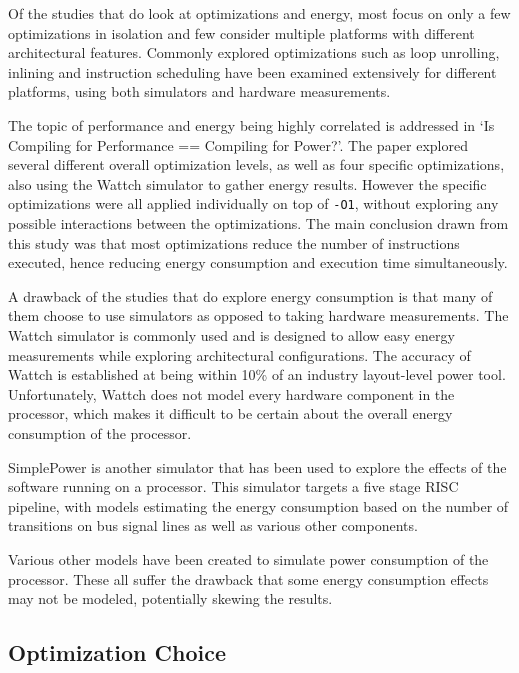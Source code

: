 \documentclass[twocolumn]{article}
\begin{document}
Of the studies that do look at optimizations and energy, most focus on only a few optimizations in isolation and few consider multiple platforms with different architectural features. Commonly explored optimizations such as loop unrolling, inlining and instruction scheduling have been examined extensively for different platforms, using both simulators and hardware measurements\cite{EffectOfCompilerOptimizationsOnPentium4}.

The topic of performance and energy being highly correlated is addressed in `Is Compiling for Performance == Compiling for Power?'\cite{CompilingForPerformancePower}. The paper explored several different overall optimization levels, as well as four specific optimizations, also using the Wattch simulator to gather energy results. However the specific optimizations were all applied individually on top of \texttt{-O1}, without exploring any possible interactions between the optimizations. The main conclusion drawn from this study was that most optimizations reduce the number of instructions executed, hence reducing energy consumption and execution time simultaneously.

A drawback of the studies that do explore energy consumption is that many of them choose to use simulators as opposed to taking hardware measurements. The Wattch simulator\cite{Wattch} is commonly used and is designed to allow easy energy measurements while exploring architectural configurations. The accuracy of Wattch is established at being within 10\% of an industry layout-level power tool. Unfortunately, Wattch does not model every hardware component in the processor, which makes it difficult to be certain about the overall energy consumption of the processor.

SimplePower\cite{SimplePower} is another simulator that has been used to explore the effects of the software running on a processor. This simulator targets a five stage RISC pipeline, with models estimating the energy consumption based on the number of transitions on bus signal lines as well as various other components.

Various other models have been created to simulate power consumption of the processor\cite{Park2011,Schneider2005}. These all suffer the drawback that some energy consumption effects may not be modeled, potentially skewing the results.

\subsection{Optimization Choice}
\end{document}
